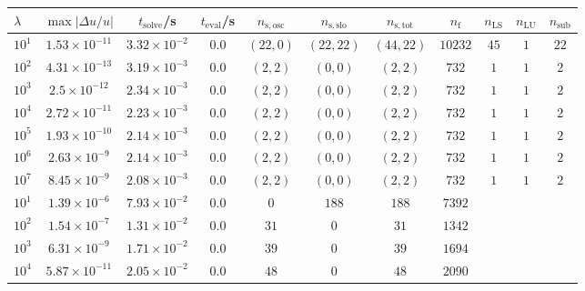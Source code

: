 \begin{tabular}{l c c c c c c c c c c}
\hline \hline 
$\lambda$  &  $\max|\Delta u/u|$  &  $t_{\mathrm{solve}}$/\si{\s}  &
$t_{\mathrm{eval}}$/\si{\s}  &  $n_{\mathrm{s,osc}}$  &  $n_{\mathrm{s,slo}}$
&  $n_{\mathrm{s,tot}}$  &  $n_{\mathrm{f}}$  &  $n_{\mathrm{LS}}$  &
$n_{\mathrm{LU}}$  &  $n_{\mathrm{sub}}$ \\ \hline
$10^1$  &  $1.53 \times 10^{-11}$  &  $3.32\times 10^{-2}$  &  $0.0$  &  $(22, 0)$  &  $(22, 22)$  &  $(44, 22)$  &  $10232$  &  $45$  &  $1$  &  $22$\\ 
$10^2$  &  $4.31 \times 10^{-13}$  &  $3.19\times 10^{-3}$  &  $0.0$  &  $(2, 2)$  &  $(0, 0)$  &  $(2, 2)$  &  $732$  &  $1$  &  $1$  &  $2$\\ 
$10^3$  &  $2.5 \times 10^{-12}$  &  $2.34\times 10^{-3}$  &  $0.0$  &  $(2, 2)$  &  $(0, 0)$  &  $(2, 2)$  &  $732$  &  $1$  &  $1$  &  $2$\\ 
$10^4$  &  $2.72 \times 10^{-11}$  &  $2.23\times 10^{-3}$  &  $0.0$  &  $(2, 2)$  &  $(0, 0)$  &  $(2, 2)$  &  $732$  &  $1$  &  $1$  &  $2$\\ 
$10^5$  &  $1.93 \times 10^{-10}$  &  $2.14\times 10^{-3}$  &  $0.0$  &  $(2, 2)$  &  $(0, 0)$  &  $(2, 2)$  &  $732$  &  $1$  &  $1$  &  $2$\\ 
$10^6$  &  $2.63 \times 10^{-9}$  &  $2.14\times 10^{-3}$   &  $0.0$  &  $(2, 2)$  &  $(0, 0)$  &  $(2, 2)$  &  $732$  &  $1$  &  $1$  &  $2$\\ 
$10^7$  &  $8.45 \times 10^{-9}$  &  $2.08\times 10^{-3}$  &  $0.0$  &  $(2, 2)$  &  $(0, 0)$  &  $(2, 2)$  &  $732$  &  $1$  &  $1$  &  $2$\\ 
\hline \hline
$10^1$  &  $1.39 \times 10^{-6}$  &  $7.93 \times 10^{-2}$  &  $0.0$  &  $0$  &  $188$  &  $188$  &  $7392$ & & & \\ 
$10^2$  &  $1.54 \times 10^{-7}$  &  $1.31 \times 10^{-2}$  &  $0.0$  &  $31$  &  $0$  &  $31$  &  $1342$  & & & \\ 
$10^3$  &  $6.31 \times 10^{-9}$  &  $1.71 \times 10^{-2}$  &  $0.0$  &  $39$  &  $0$  &  $39$  &  $1694$  & & & \\ 
$10^4$  &  $5.87 \times 10^{-11}$  &  $2.05 \times 10^{-2}$  &  $0.0$  &  $48$  &  $0$  &  $48$  &  $2090$  & & & \\ 

\end{tabular}

